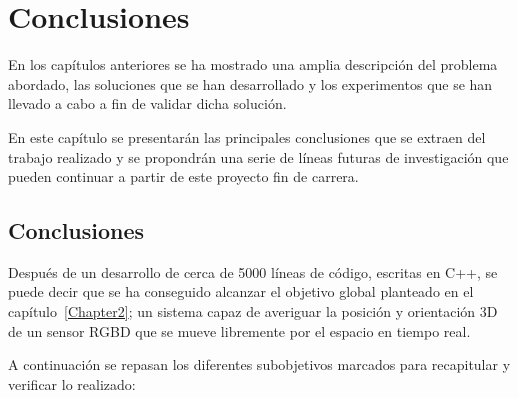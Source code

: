 
\chapter{Conclusiones}

\label{Chapter6} %

En los capítulos anteriores se ha mostrado una amplia descripción del problema abordado, las soluciones que se han desarrollado y los experimentos que se han llevado a cabo a fin de validar dicha solución.

En este capítulo se presentarán las principales conclusiones que se extraen del trabajo realizado y se propondrán una serie de líneas futuras de investigación que pueden continuar a partir de este proyecto fin de carrera.

\section{Conclusiones}

Después de un desarrollo de cerca de 5000 líneas de código, escritas en C++, se puede decir que se ha conseguido alcanzar el objetivo global planteado en el capítulo~\ref{Chapter2}; un sistema capaz de averiguar la posición y orientación 3D de un sensor RGBD que se mueve libremente por el espacio en tiempo real.

A continuación se repasan los diferentes subobjetivos marcados para recapitular y verificar lo realizado:


